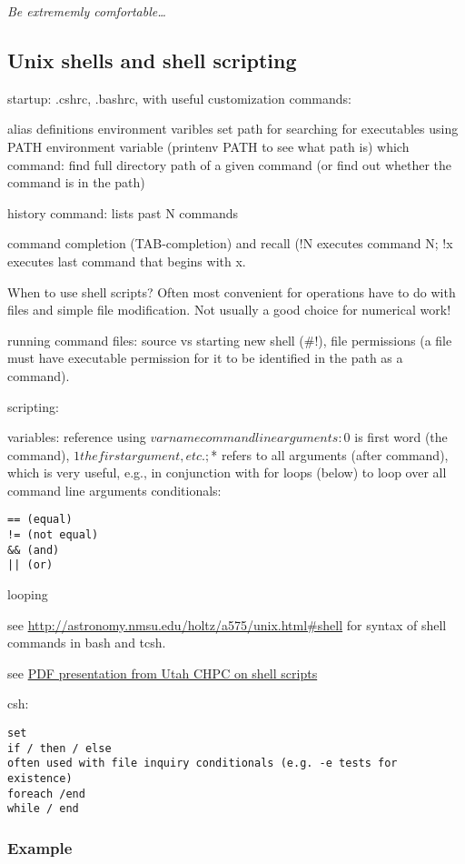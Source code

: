 \documentclass{article}
\newcommand{\test}[1]{%
    \begin{center}
        \colorbox{hl}{\parbox{0.9\textwidth}{\emph{\centering #1}}}
    \end{center}}
\begin{document}
\test{Be extrememly comfortable\ldots}



\subsection{Unix shells and shell scripting}

startup: .cshrc, .bashrc, with useful customization commands:

alias definitions
environment varibles
set path for searching for executables using PATH environment variable
(printenv PATH to see what path is)
which command: find full directory path of a given command (or find
out whether the command is in the path)

history command: lists past N commands

command completion (TAB-completion) and recall (!N executes command N;
!x executes last command that begins with x.

When to use shell scripts? Often most convenient for operations have
to do with files and simple file modification. Not usually a good
choice for numerical work!

running command files: source vs starting new shell (\#!), file
permissions (a file must have executable permission for it to be
identified in the path as a command).

scripting:

variables: reference using $varname
command line arguments: $0 is first word (the command), $1 the first
argument, etc.; $* refers to all arguments (after command), which is
very useful, e.g., in conjunction with for loops (below) to loop over
all command line arguments
conditionals:
\begin{verbatim}
== (equal)
!= (not equal)
&& (and)
|| (or)
\end{verbatim}
looping

see \url{http://astronomy.nmsu.edu/holtz/a575/unix.html#shell}
for syntax of shell commands in bash and tcsh.

see
\href{http://astronomy.nmsu.edu/holtz/a575/IntroScriptingJuly2015.pdf}
{PDF presentation from Utah CHPC on shell scripts}

csh:
\begin{verbatim}
set
if / then / else
often used with file inquiry conditionals (e.g. -e tests for
existence)
foreach /end
while / end
\end{verbatim}


\subsubsection{Example}
\end{document}
